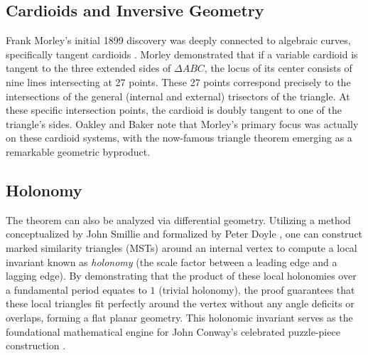 \documentclass{amsart}
\begin{document}
\subsection{Cardioids and Inversive Geometry}Frank Morley's initial 1899 discovery was deeply connected to algebraic curves, specifically tangent cardioids \cite{morley1933}. Morley demonstrated that if a variable cardioid is tangent to the three extended sides of $\Delta ABC$, the locus of its center consists of nine lines intersecting at 27 points. These 27 points correspond precisely to the intersections of the general (internal and external) trisectors of the triangle. At these specific intersection points, the cardioid is doubly tangent to one of the triangle's sides. Oakley and Baker \cite{oakley} note that Morley's primary focus was actually on these cardioid systems, with the now-famous triangle theorem emerging as a remarkable geometric byproduct.\subsection{Holonomy}The theorem can also be analyzed via differential geometry. Utilizing a method conceptualized by John Smillie and formalized by Peter Doyle \cite{doyle}, one can construct marked similarity triangles (MSTs) around an internal vertex to compute a local invariant known as \textit{holonomy} (the scale factor between a leading edge and a lagging edge). By demonstrating that the product of these local holonomies over a fundamental period equates to $1$ (trivial holonomy), the proof guarantees that these local triangles fit perfectly around the vertex without any angle deficits or overlaps, forming a flat planar geometry. This holonomic invariant serves as the foundational mathematical engine for John Conway's celebrated puzzle-piece construction \cite{conway}.
	
\end{document}
